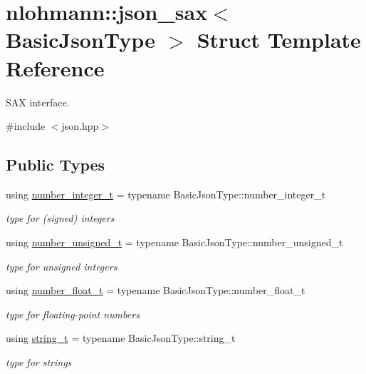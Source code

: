 \hypertarget{structnlohmann_1_1json__sax}{}\section{nlohmann\+:\+:json\+\_\+sax$<$ Basic\+Json\+Type $>$ Struct Template Reference}
\label{structnlohmann_1_1json__sax}


S\+AX interface.  




{\ttfamily \#include $<$json.\+hpp$>$}

\subsection*{Public Types}
\begin{DoxyCompactItemize}
\item 
\mbox{\label{structnlohmann_1_1json__sax_a0cef30121f02b7fee85e9708148ea0aa}} 
using \hyperlink{structnlohmann_1_1json__sax_a0cef30121f02b7fee85e9708148ea0aa}{number\+\_\+integer\+\_\+t} = typename Basic\+Json\+Type\+::number\+\_\+integer\+\_\+t
\begin{DoxyCompactList}\small\item\em type for (signed) integers \end{DoxyCompactList}\item 
\mbox{\label{structnlohmann_1_1json__sax_a32028cc056ae0f43aaae331cdbbbf856}} 
using \hyperlink{structnlohmann_1_1json__sax_a32028cc056ae0f43aaae331cdbbbf856}{number\+\_\+unsigned\+\_\+t} = typename Basic\+Json\+Type\+::number\+\_\+unsigned\+\_\+t
\begin{DoxyCompactList}\small\item\em type for unsigned integers \end{DoxyCompactList}\item 
\mbox{\label{structnlohmann_1_1json__sax_a390c209bffd8c4800c8f3076dc465a20}} 
using \hyperlink{structnlohmann_1_1json__sax_a390c209bffd8c4800c8f3076dc465a20}{number\+\_\+float\+\_\+t} = typename Basic\+Json\+Type\+::number\+\_\+float\+\_\+t
\begin{DoxyCompactList}\small\item\em type for floating-\/point numbers \end{DoxyCompactList}\item 
\mbox{\label{structnlohmann_1_1json__sax_ae01977a9f3c5b3667b7a2929ed91061e}} 
using \hyperlink{structnlohmann_1_1json__sax_ae01977a9f3c5b3667b7a2929ed91061e}{string\+\_\+t} = typename Basic\+Json\+Type\+::string\+\_\+t
\begin{DoxyCompactList}\small\item\em type for strings \end{DoxyCompactList}\end{DoxyCompactItemize}
